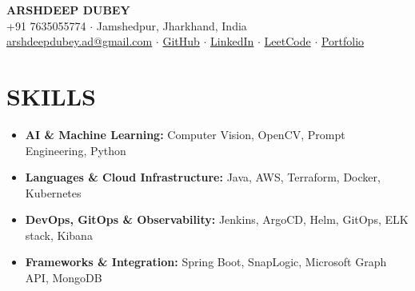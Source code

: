 \documentclass[10pt,a4paper]{article}
\begin{document}
\pagestyle{empty}

\begin{center}
    {\LARGE \bfseries \color{primary} ARSHDEEP DUBEY} \\[4pt]
    \small
    +91 7635055774 $\cdot$ Jamshedpur, Jharkhand, India \\[3pt]
    \href{mailto:arshdeepdubey.ad@gmail.com}{arshdeepdubey.ad@gmail.com} $\cdot$ \href{https://github.com/Arshdeepdubey}{GitHub} $\cdot$ \href{https://www.linkedin.com/in/dubey-arshdeep}{LinkedIn} $\cdot$ \href{https://leetcode.com/u/zorojuro_conqueror/}{LeetCode} $\cdot$ \href{https://arshdeepdubey.github.io/Portfolio/}{Portfolio}
\end{center}
\vspace{-4pt}

\section*{SKILLS}
\small

\begin{itemize}
\item \textbf{AI \& Machine Learning:} Computer Vision, OpenCV, Prompt Engineering, Python
\item \textbf{Languages \& Cloud Infrastructure:} Java, AWS, Terraform, Docker, Kubernetes
\item \textbf{DevOps, GitOps \& Observability:} Jenkins, ArgoCD, Helm, GitOps, ELK stack, Kibana
\item \textbf{Frameworks \& Integration:} Spring Boot, SnapLogic, Microsoft Graph API, MongoDB
\end{itemize}
\end{document}
